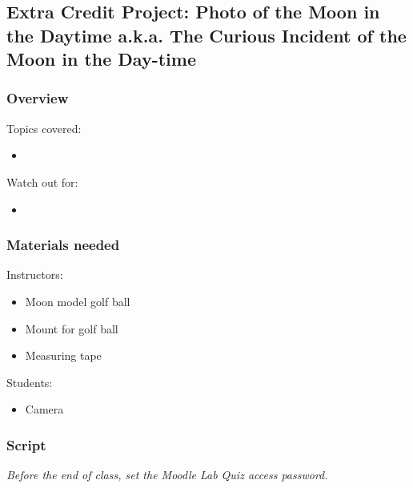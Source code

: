 \documentclass[12pt]{article}
\begin{document}
\newpage
\subsection{Extra Credit Project: Photo of the Moon in the Daytime a.k.a. The Curious Incident of the Moon in the Day-time}

\subsubsection{Overview}

Topics covered:
\begin{itemize}
\item 
\end{itemize}

\noindent
Watch out for:
\begin{itemize}
\item 
\end{itemize}


\subsubsection{Materials needed}

Instructors:
\begin{itemize}
\item Moon model golf ball
\item Mount for golf ball
\item Measuring tape
\end{itemize}

\noindent
Students:
\begin{itemize}
\item Camera
\end{itemize}


\subsubsection{Script}


\emph{Before the end of class, set the Moodle Lab Quiz access password.}
\end{document}
